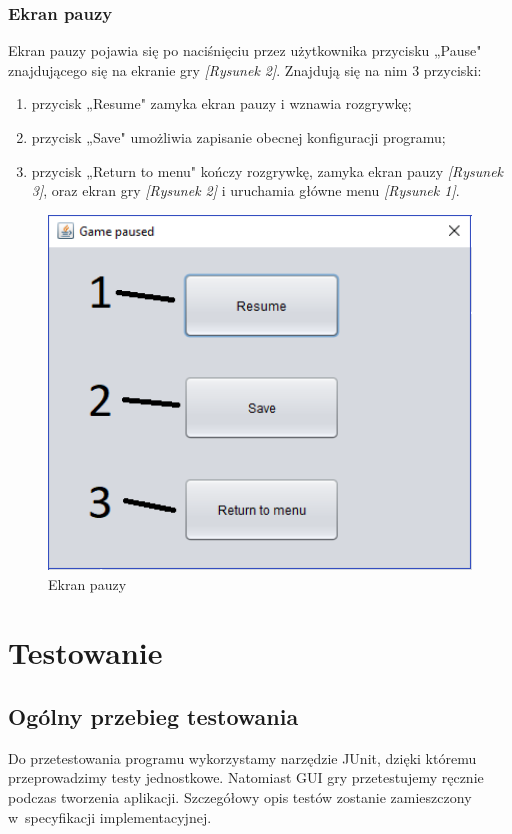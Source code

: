 \documentclass[12pt]{report}
\begin{document}
    \subsubsection{Ekran pauzy}
    Ekran pauzy pojawia się po naciśnięciu przez użytkownika przycisku „Pause" znajdującego się na ekranie gry \textit{[Rysunek 2]}. Znajdują się na nim 3 przyciski:
    \begin{enumerate}
        \item przycisk „Resume" zamyka ekran pauzy i wznawia rozgrywkę;
        \item przycisk „Save" umożliwia zapisanie obecnej konfiguracji programu;
        \item przycisk „Return to menu" kończy rozgrywkę, zamyka ekran pauzy \textit{[Rysunek 3]}, oraz ekran gry \textit{[Rysunek 2]} i uruchamia główne menu \textit{[Rysunek 1]}.
    \end{enumerate}
    \begin{figure}[H]
    \centering
    \includegraphics[width=14cm]{Obrazy/pausemenuscreen.png}
    \caption{Ekran pauzy}
    \label{Pause menu}
    \end{figure}

\section{Testowanie}
\subsection{Ogólny przebieg testowania}
Do przetestowania programu wykorzystamy narzędzie JUnit, dzięki któremu przeprowadzimy testy jednostkowe. Natomiast GUI gry przetestujemy ręcznie podczas tworzenia aplikacji. Szczegółowy opis testów zostanie zamieszczony w~specyfikacji implementacyjnej.
\end{document}
